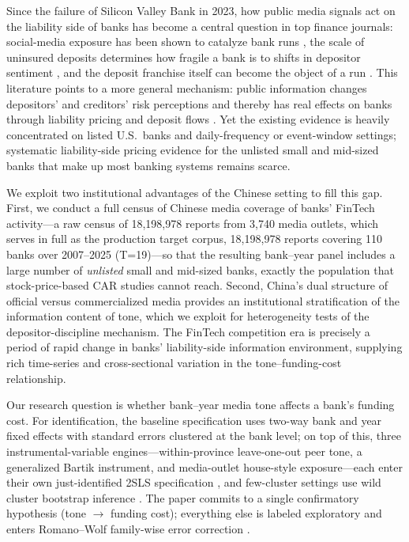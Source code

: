 Since the failure of Silicon Valley Bank in 2023, how public media
signals act on the liability side of banks has become a central question
in top finance journals: social-media exposure has been shown to
catalyze bank runs \parencite{cookson2026runcatalyst}, the scale of
uninsured deposits determines how fragile a bank is to shifts in
depositor sentiment \parencite{jiang2024fragility}, and the deposit
franchise itself can become the object of a run
\parencite{drechsler2026franchise}. This literature points to a more
general mechanism: public information changes depositors' and
creditors' risk perceptions and thereby has real effects on banks
through liability pricing and deposit flows
\parencite{goldstein2023information}. Yet the existing evidence is
heavily concentrated on listed U.S.\ banks and daily-frequency or
event-window settings; systematic liability-side pricing evidence for
the unlisted small and mid-sized banks that make up most banking
systems remains scarce.

We exploit two institutional advantages of the Chinese setting to fill
this gap. First, we conduct a full census of Chinese media coverage of
banks' FinTech activity---a raw census of 18{,}198{,}978 reports from
3{,}740 media outlets, which serves in full as the production target
corpus, 18{,}198{,}978 reports covering 110 banks over 2007--2025
(T=19)---so that the resulting bank--year panel includes a large number
of \emph{unlisted} small and mid-sized banks, exactly the population
that stock-price-based CAR studies cannot reach. Second, China's dual
structure of official versus commercialized media
\parencite{qin2018mediabias, you2018pen} provides an institutional
stratification of the information content of tone, which we exploit for
heterogeneity tests of the depositor-discipline mechanism. The FinTech
competition era is precisely a period of rapid change in banks'
liability-side information environment, supplying rich time-series and
cross-sectional variation in the tone--funding-cost relationship.

Our research question is whether bank--year media tone affects a bank's
funding cost. For identification, the baseline specification uses
two-way bank and year fixed effects with standard errors clustered at
the bank level; on top of this, three instrumental-variable
engines---within-province leave-one-out peer tone, a generalized Bartik
instrument, and media-outlet house-style exposure---each enter their own
just-identified 2SLS specification
\parencite{goldsmith2020bartik, wang2024wildiv}, and few-cluster
settings use wild cluster bootstrap inference
\parencite{mackinnon2017wild}. The paper commits to a single
confirmatory hypothesis (tone $\to$ funding cost); everything else is
labeled exploratory and enters Romano--Wolf family-wise error
correction \parencite{romanowolf2005stepwise}.

